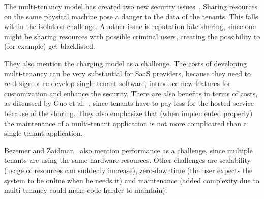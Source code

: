 The multi-tenancy model has created two new security issues~\cite{dillon2010cloud}. Sharing resources on the same physical machine pose a danger to the data of the tenants. This falls within the isolation challenge. Another issue is reputation fate-sharing, since one might be sharing resources with possible criminal users, creating the possibility to (for example) get blacklisted.

They also mention the charging model as a challenge. The costs of developing multi-tenancy can be very substantial for \ac{SaaS} providers, because they need to re-design or re-develop single-tenant software, introduce new features for customization and enhance the security.
There are also benefits in terms of costs, as discussed by Guo et al.~\cite{guo2007framework}, since tenants have to pay less for the hosted service because of the sharing. They also emphasize that (when implemented properly) the maintenance of a multi-tenant application is not more complicated than a single-tenant application.

Bezemer and Zaidman~\cite{bezemer2010multi} also mention performance as a challenge, since multiple tenants are using the same hardware resources. Other challenges are scalability (usage of resources can suddenly increase), zero-downtime (the user expects the system to be online when he needs it) and maintenance (added complexity due to multi-tenancy could make code harder to maintain).